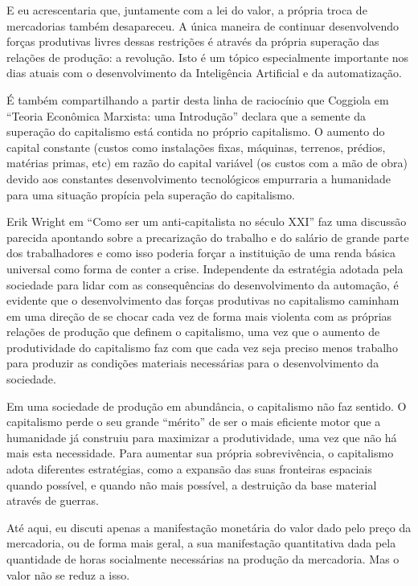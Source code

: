 E eu acrescentaria que, juntamente com a lei do valor, a própria troca de mercadorias também desapareceu. A única maneira de continuar desenvolvendo forças produtivas livres dessas restrições é através da própria superação das relações de produção: a revolução. Isto é um tópico especialmente importante nos dias atuais com o desenvolvimento da Inteligência Artificial e da automatização. 

É também compartilhando a partir desta linha de raciocínio que Coggiola em “Teoria Econômica Marxista: uma Introdução” declara que a semente da superação do capitalismo está contida no próprio capitalismo. O aumento do capital constante (custos como instalações fixas, máquinas, terrenos, prédios, matérias primas, etc) em razão do capital variável (os custos com a mão de obra) devido aos constantes desenvolvimento tecnológicos empurraria a humanidade para uma situação propícia pela superação do capitalismo.

Erik Wright em “Como ser um anti-capitalista no século XXI” faz uma discussão parecida apontando sobre a precarização do trabalho e do salário de grande parte dos trabalhadores e como isso poderia forçar a instituição de uma renda básica universal como forma de conter a crise. Independente da estratégia adotada pela sociedade para lidar com as consequências do desenvolvimento da automação, é evidente que o desenvolvimento das forças produtivas no capitalismo caminham em uma direção de se chocar cada vez de forma mais violenta com as próprias relações de produção que definem o capitalismo, uma vez que o aumento de produtividade do capitalismo faz com que cada vez seja preciso menos trabalho para produzir as condições materiais necessárias para o desenvolvimento da sociedade.

Em uma sociedade de produção em abundância, o capitalismo não faz sentido. O capitalismo perde o seu grande “mérito” de ser o mais eficiente motor que a humanidade já construiu para maximizar a produtividade, uma vez que não há mais esta necessidade. Para aumentar sua própria sobrevivência, o capitalismo adota diferentes estratégias, como a expansão das suas fronteiras espaciais quando possível, e quando não mais possível, a destruição da base material através de guerras.

Até aqui, eu discuti apenas a manifestação monetária do valor dado pelo preço da mercadoria, ou de forma mais geral, a sua manifestação quantitativa dada pela quantidade de horas socialmente necessárias na produção da mercadoria. Mas o valor não se reduz a isso.

